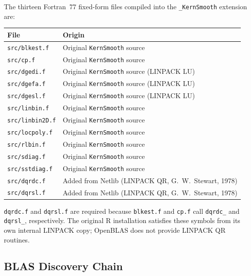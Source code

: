 \documentclass[12pt,a4paper]{article}
\newcommand{\pkg}[1]{\texttt{#1}}
\begin{document}
The thirteen Fortran~77 fixed-form files compiled into the \pkg{\_KernSmooth} extension are:
\begin{center}
\begin{tabular}{ll}
\toprule
File & Origin \\
\midrule
\texttt{src/blkest.f} & Original \pkg{KernSmooth} source \\
\texttt{src/cp.f}     & Original \pkg{KernSmooth} source \\
\texttt{src/dgedi.f}  & Original \pkg{KernSmooth} source (LINPACK LU) \\
\texttt{src/dgefa.f}  & Original \pkg{KernSmooth} source (LINPACK LU) \\
\texttt{src/dgesl.f}  & Original \pkg{KernSmooth} source (LINPACK LU) \\
\texttt{src/linbin.f}   & Original \pkg{KernSmooth} source \\
\texttt{src/linbin2D.f} & Original \pkg{KernSmooth} source \\
\texttt{src/locpoly.f}  & Original \pkg{KernSmooth} source \\
\texttt{src/rlbin.f}    & Original \pkg{KernSmooth} source \\
\texttt{src/sdiag.f}    & Original \pkg{KernSmooth} source \\
\texttt{src/sstdiag.f}  & Original \pkg{KernSmooth} source \\
\texttt{src/dqrdc.f}  & Added from Netlib (LINPACK QR, G.~W.~Stewart, 1978) \\
\texttt{src/dqrsl.f}  & Added from Netlib (LINPACK QR, G.~W.~Stewart, 1978) \\
\bottomrule
\end{tabular}
\end{center}
\texttt{dqrdc.f} and \texttt{dqrsl.f} are required because \texttt{blkest.f} and \texttt{cp.f} call \texttt{dqrdc\_} and \texttt{dqrsl\_}, respectively. The original R installation satisfies these symbols from its own internal LINPACK copy; OpenBLAS does not provide LINPACK QR routines.

\subsection{BLAS Discovery Chain}
\end{document}
